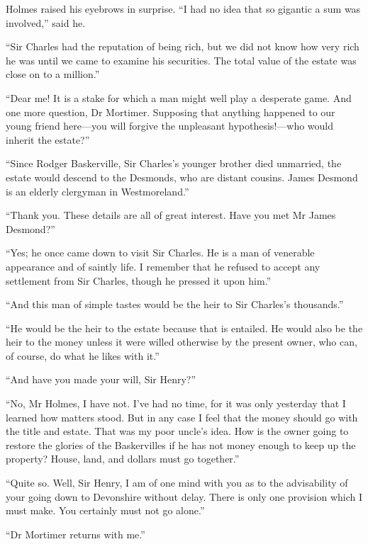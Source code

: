 \documentclass[paper=a5,BCOR=7mm,twoside,DIV=calc,12pt,usegeometry,openany,chapterprefix,endperiod,headings=big]{scrbook} %
\begin{document}
Holmes raised his eyebrows in surprise. \enquote{I had no idea that so gigantic a sum was involved,} said he.

\enquote{Sir Charles had the reputation of being rich, but we did not know how very rich he was until we came to examine his securities. The total value of the estate was close on to a million.}

\enquote{Dear me! It is a stake for which a man might well play a desperate game. And one more question, Dr Mortimer. Supposing that anything happened to our young friend here---you will forgive the unpleasant hypothesis!---who would inherit the estate?}

\enquote{Since Rodger Baskerville, Sir Charles's younger brother died unmarried, the estate would descend to the Desmonds, who are distant cousins. James Desmond is an elderly clergyman in Westmoreland.}

\enquote{Thank you. These details are all of great interest. Have you met Mr James Desmond?}

\enquote{Yes; he once came down to visit Sir Charles. He is a man of venerable appearance and of saintly life. I remember that he refused to accept any settlement from Sir Charles, though he pressed it upon him.}

\enquote{And this man of simple tastes would be the heir to Sir Charles's thousands.}

\enquote{He would be the heir to the estate because that is entailed. He would also be the heir to the money unless it were willed otherwise by the present owner, who can, of course, do what he likes with it.}




\enquote{And have you made your will, Sir Henry?}

\enquote{No, Mr Holmes, I have not. I've had no time, for it was only yesterday that I learned how matters stood. But in any case I feel that the money should go with the title and estate. That was my poor uncle's idea. How is the owner going to restore the glories of the Baskervilles if he has not money enough to keep up the property? House, land, and dollars must go together.}

\enquote{Quite so. Well, Sir Henry, I am of one mind with you as to the advisability of your going down to Devonshire without delay. There is only one provision which I must make. You certainly must not go alone.}

\enquote{Dr Mortimer returns with me.}
\end{document}
